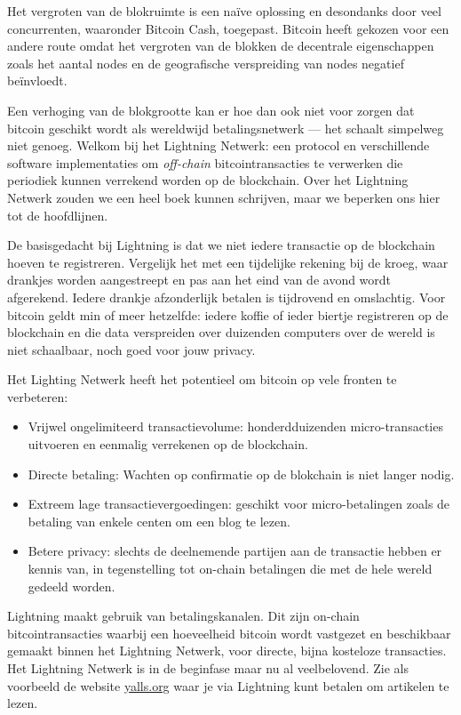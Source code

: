 \documentclass[
  letterpaper,
]{scrbook}
\begin{document}
Het vergroten van de blokruimte is een naïve oplossing en desondanks
door veel concurrenten, waaronder Bitcoin Cash, toegepast. Bitcoin heeft
gekozen voor een andere route omdat het vergroten van de blokken de
decentrale eigenschappen zoals het aantal nodes en de geografische
verspreiding van nodes negatief beïnvloedt.

Een verhoging van de blokgrootte kan er hoe dan ook niet voor zorgen dat
bitcoin geschikt wordt als wereldwijd betalingsnetwerk --- het schaalt
simpelweg niet genoeg. Welkom bij het Lightning Netwerk: een protocol en
verschillende software implementaties om \emph{off-chain}
bitcointransacties te verwerken die periodiek kunnen verrekend worden op
de blockchain. Over het Lightning Netwerk zouden we een heel boek kunnen
schrijven, maar we beperken ons hier tot de hoofdlijnen.

De basisgedacht bij Lightning is dat we niet iedere transactie op de
blockchain hoeven te registreren. Vergelijk het met een tijdelijke
rekening bij de kroeg, waar drankjes worden aangestreept en pas aan het
eind van de avond wordt afgerekend. Iedere drankje afzonderlijk betalen
is tijdrovend en omslachtig. Voor bitcoin geldt min of meer hetzelfde:
iedere koffie of ieder biertje registreren op de blockchain en die data
verspreiden over duizenden computers over de wereld is niet schaalbaar,
noch goed voor jouw privacy.

Het Lighting Netwerk heeft het potentieel om bitcoin op vele fronten te
verbeteren:

\begin{itemize}
\item
  Vrijwel ongelimiteerd transactievolume: honderdduizenden
  micro-transacties uitvoeren en eenmalig verrekenen op de blockchain.
\item
  Directe betaling: Wachten op confirmatie op de blokchain is niet
  langer nodig.
\item
  Extreem lage transactievergoedingen: geschikt voor micro-betalingen
  zoals de betaling van enkele centen om een blog te lezen.
\item
  Betere privacy: slechts de deelnemende partijen aan de transactie
  hebben er kennis van, in tegenstelling tot on-chain betalingen die met
  de hele wereld gedeeld worden.
\end{itemize}

Lightning maakt gebruik van betalingskanalen. Dit zijn on-chain
bitcointransacties waarbij een hoeveelheid bitcoin wordt vastgezet en
beschikbaar gemaakt binnen het Lightning Netwerk, voor directe, bijna
kosteloze transacties. Het Lightning Netwerk is in de beginfase maar nu
al veelbelovend. Zie als voorbeeld de website
\href{https://yalls.org}{yalls.org} waar je via Lightning kunt betalen
om artikelen te lezen.
\end{document}
